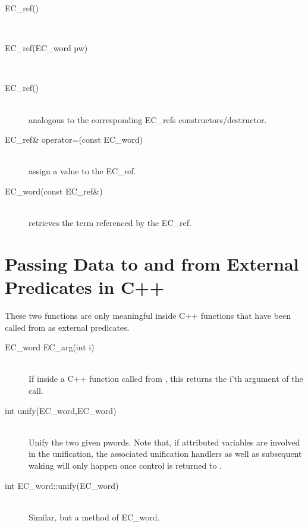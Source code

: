 \begin{description}
\item[EC_ref()]\ \\
\item[EC_ref(EC_word pw)]\ \\
\item[\tld EC_ref()]\ \\
	analogous to the corresponding EC_refs constructors/destructor.

\item[EC_ref\& operator=(const EC_word)]\ \\
	assign a value to the EC_ref.

\item[EC_word(const EC_ref\&)]\ \\
	retrieves the {\eclipse} term referenced by the EC_ref.
\end{description}

\section{Passing Data to and from External Predicates in C++}
These two functions are only meaningful inside C++ functions that have been
called from {\eclipse} as external predicates.
\begin{description}
\item[EC_word		EC_arg(int i)]\ \\
	If inside a C++ function called from {\eclipse}, this returns the
	i'th argument of the call.

\item[int		unify(EC_word,EC_word)]\ \\
	Unify the two given pwords. Note that, if attributed variables
	are involved in the unification, the associated unification handlers
	as well as subsequent waking will only happen once control is
	returned to {\eclipse}.

\item[int		EC_word::unify(EC_word)]\ \\
	Similar, but a method of EC_word.
\end{description}

